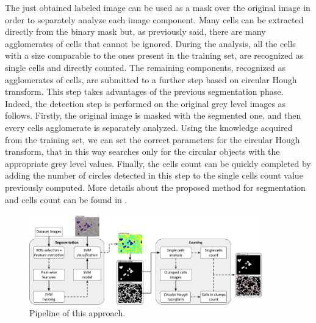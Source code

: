 {	The just obtained labeled image can be used as a mask over the original image in order to separately analyze each image component. Many cells can be extracted directly from the binary mask but, as previously said, there are many agglomerates of cells that cannot be ignored. During the analysis, all the cells with a size comparable to the ones present in the training set, are recognized as single cells and directly counted. The remaining components, recognized as agglomerates of cells, are submitted to a further step based on circular Hough transform. This step takes advantages of the previous segmentation phase. Indeed, the detection step is performed on the original grey level images as follows. Firstly, the original image is masked with the segmented one, and then every cells agglomerate is separately analyzed. Using the knowledge acquired from the training set, we can set the correct parameters for the circular Hough transform, that in this way searches only for the circular objects with the appropriate grey level values. Finally, the cells count can be quickly completed by adding the number of circles detected in this step to the single cells count value previously computed. More details about the proposed method for segmentation and cells count can be found in \cite{DiRuberto2016}.
	
	\begin{figure}[h]
		\centering
		\includegraphics[width=0.90\textwidth]{images/2016_2_sitis/Schema}
		\caption[WBCs count pipeline.]{\label{fig:Schema}Pipeline of this approach.}
	\end{figure}
	
}
